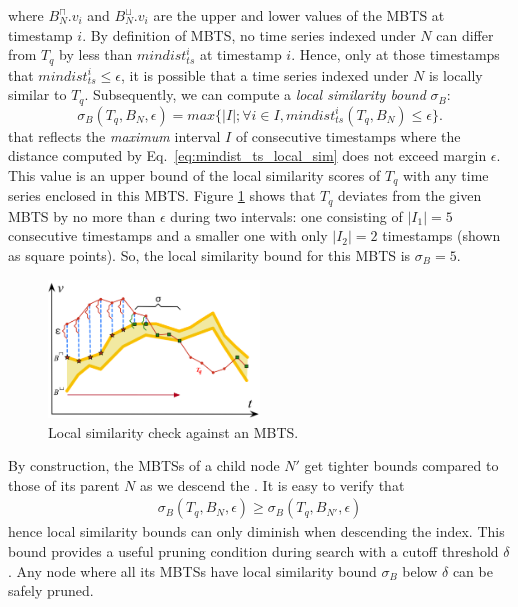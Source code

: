 \noindent where $B_{N}^{\sqcap}.v_i$ and $B_{N}^{\sqcup}.v_i$ are the upper and lower values of the MBTS at timestamp $i$. By definition of MBTS, no time series indexed under $N$ can differ from $T_q$ by less than $mindist_{ts}^i$ at timestamp $i$. Hence, only at those timestamps that $mindist_{ts}^i \leq \epsilon$, it is possible that a time series indexed under $N$ is locally similar to $T_q$. Subsequently, we can compute a {\em local similarity bound} $\sigma_B$:
\begin{equation}
\sigma_{B}(T_q, B_N, \epsilon) = max\{|I|; \forall i \in I, mindist^i_{ts}(T_q, B_N) \leq \epsilon\}.
\label{eq:sim_bound}
\end{equation}
\noindent that reflects the {\em maximum} interval $I$ of consecutive timestamps where the distance computed by Eq.~\ref{eq:mindist_ts_local_sim} does not exceed margin $\epsilon$. 
This value is an upper bound of the local similarity scores of $T_q$ with any time series enclosed in this MBTS. Figure \ref{fig:sim_mbts} shows that $T_q$ deviates from the given MBTS by no more than $\epsilon$ during two intervals: one consisting of $|I_1|=5$ consecutive timestamps and a smaller one with only $|I_2|=2$ timestamps (shown as square points). So, the local similarity bound for this MBTS is $\sigma_{B}=5$.

\begin{figure}[!tb]
    \centering
    \includegraphics[width=0.5\textwidth]{Figures/sim_mbts.png}
    \caption{Local similarity check against an MBTS.}
    \label{fig:sim_mbts}
\end{figure}

By construction, the MBTSs of a child node $N'$ get tighter bounds compared to those of its parent $N$ as we descend the \btsr. It is easy to verify that 
\begin{equation}
\begin{split}
\sigma_{B}(T_q, B_N, \epsilon) \geq \sigma_{B}(T_q, B_{N'}, \epsilon)
\end{split}
\label{eq:maxdur_ts}
\end{equation}
\noindent hence local similarity bounds can only diminish when descending the index. This bound provides a useful pruning condition during search with a cutoff threshold $\delta$. Any node where all its MBTSs have local similarity bound $\sigma_{B}$ below $\delta$ can be safely pruned.


